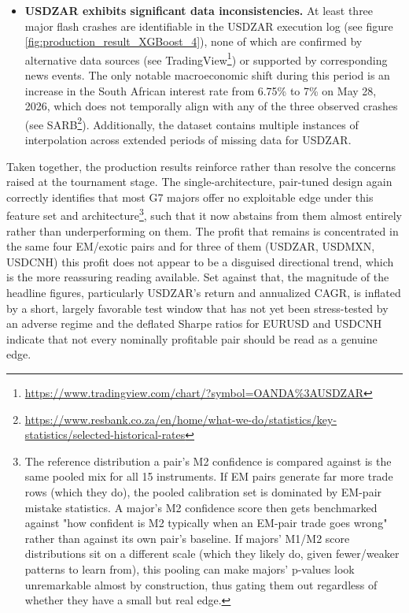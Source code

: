 \documentclass[12pt, a4paper]{article}
\begin{document}
\begin{itemize}
\item \textbf{USDZAR exhibits significant data inconsistencies.} At least three major flash crashes are identifiable in the USDZAR execution log 
(see figure \ref{fig:production_result_XGBoost_4}), none of which are confirmed by alternative data sources (see TradingView\footnote{\url{https://www.tradingview.com/chart/?symbol=OANDA\%3AUSDZAR}}) 
or supported by corresponding news events. The only notable macroeconomic shift during this period is an increase in the South African interest rate from 6.75\% to 7\% on 
May 28, 2026, which does not temporally align with any of the three observed crashes (see SARB\footnote{\url{https://www.resbank.co.za/en/home/what-we-do/statistics/key-statistics/selected-historical-rates}}). 
Additionally, the dataset contains multiple instances of interpolation across extended periods of missing data for USDZAR.
\end{itemize}

\medskip

Taken together, the production results reinforce rather than resolve the concerns raised at the tournament stage. The single-architecture, pair-tuned design again correctly 
identifies that most G7 majors offer no exploitable edge under this feature set and architecture\footnote{The reference distribution a pair's M2 confidence is compared against is the same pooled mix for 
all 15 instruments. If EM pairs generate far more trade rows (which they do), the pooled calibration set is dominated by EM-pair mistake statistics. A major's M2 confidence score 
then gets benchmarked against "how confident is M2 typically when an EM-pair trade goes wrong" rather than against its own pair's baseline. 
If majors' M1/M2 score distributions sit on a different scale (which they likely do, given fewer/weaker patterns to learn from), this pooling can make majors' p-values look 
unremarkable almost by construction, thus gating them out regardless of whether they have a small but real edge.}, such that it now abstains from them almost entirely rather than underperforming on them. 
The profit that remains is concentrated in the same four EM/exotic pairs and for three of them (USDZAR, USDMXN, USDCNH) this profit does not appear to be a disguised directional 
trend, which is the more reassuring reading available. Set against that, the magnitude of the headline figures, particularly USDZAR's return and annualized CAGR, is inflated by a 
short, largely favorable test window that has not yet been stress-tested by an adverse regime and the deflated Sharpe ratios for EURUSD and USDCNH indicate that not every 
nominally profitable pair should be read as a genuine edge.
\end{document}
